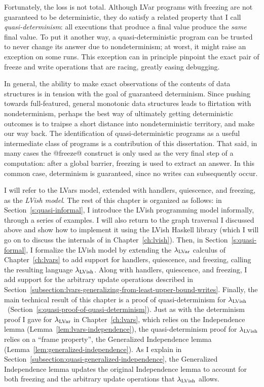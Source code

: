 Fortunately, the loss is not total.  Although LVar programs with
freezing are not guaranteed to be deterministic, they do satisfy a
related property that I call \emph{quasi-determinism}: all executions
that produce a final value produce the \emph{same} final value.  To
put it another way, a quasi-deterministic program can be trusted to
never change its answer due to nondeterminism; at worst, it might
raise an exception on some runs.  This exception can in principle
pinpoint the exact pair of freeze and write operations that are
racing, greatly easing debugging.

In general, the ability to make exact observations of the contents of
data structures is in tension with the goal of guaranteed determinism.
Since pushing towards full-featured, general monotonic data structures
leads to flirtation with nondeterminism, perhaps the best way of
ultimately getting deterministic outcomes is to traipse a short
distance into nondeterministic territory, and make our way back.  The
identification of quasi-deterministic programs as a useful
intermediate class of programs is a contribution of this dissertation.
That said, in many cases the @freeze@ construct is only used as the
very final step of a computation: after a global barrier, freezing is
used to extract an answer.  In this common case, determinism is
guaranteed, since no writes can subsequently occur.

I will refer to the LVars model, extended with handlers, quiescence,
and freezing, as the \emph{LVish model}.  The rest of this chapter is
organized as follows: in Section~\ref{s:quasi-informal}, I introduce
the LVish programming model informally, through a series of examples.
I will also return to the graph traversal I discussed above and show
how to implement it using the LVish Haskell library (which I will go
on to discuss the internals of in Chapter~\ref{ch:lvish}).  Then, in
Section~\ref{s:quasi-formal}, I formalize the LVish model by extending
the $\lambda_{\textrm{LVar}}$ calculus of Chapter~\ref{ch:lvars} to add support
for handlers, quiescence, and freezing, calling the resulting language
$\lambda_{\textrm{LVish}}$.  Along with handlers, quiescence, and freezing, I add
support for the arbitrary update operations described in
Section~\ref{subsection:lvars-generalizing-from-least-upper-bound-writes}.
Finally, the main technical result of this chapter is a proof of
quasi-determinism for
$\lambda_{\textrm{LVish}}$~(Section~\ref{s:quasi-proof-of-quasi-determinism}). Just
as with the determinism proof I gave for $\lambda_{\textrm{LVar}}$ in
Chapter~\ref{ch:lvars}, which relies on the Independence lemma
(Lemma~\ref{lem:lvars-independence}), the quasi-determinism proof for
$\lambda_{\textrm{LVish}}$ relies on a ``frame property'', the Generalized
Independence lemma (Lemma~\ref{lem:generalized-independence}).  As I
explain in Section~\ref{subsection:quasi-generalized-independence},
the Generalized Independence lemma updates the original Independence
lemma to account for both freezing and the arbitrary update operations
that $\lambda_{\textrm{LVish}}$ allows.
